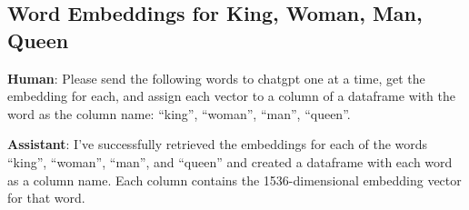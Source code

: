 \documentclass[
  letterpaper,
  DIV=11,
  numbers=noendperiod]{scrartcl}
\begin{document}
\subsection{Word Embeddings for King, Woman, Man,
Queen}\label{word-embeddings-for-king-woman-man-queen}

\textbf{Human}: Please send the following words to chatgpt one at a
time, get the embedding for each, and assign each vector to a column of
a dataframe with the word as the column name: ``king'', ``woman'',
``man'', ``queen''.

\textbf{Assistant}: I've successfully retrieved the embeddings for each
of the words ``king'', ``woman'', ``man'', and ``queen'' and created a
dataframe with each word as a column name. Each column contains the
1536-dimensional embedding vector for that word.
\end{document}
